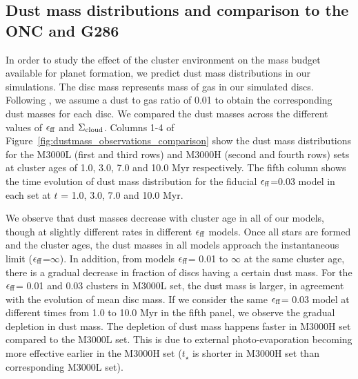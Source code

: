 \documentclass[fleqn,usenatbib]{mnras}
\newcommand\sfeff{\ensuremath{\epsilon_{\rm ff}}\xspace}   %
\newcommand\Sigmacloud{\ensuremath{\Sigma_{\rm cloud}}\xspace} %
\begin{document}
\subsection{Dust mass distributions and comparison to the ONC and G286}
\label{subsec:dustmassdistros}

In order to study the effect of the cluster environment on the mass budget available for planet formation, we predict dust mass distributions in our simulations. The disc mass represents mass of gas in our simulated discs. Following \cite{Bohlin1978ApJ...224..132B}, we assume a dust to gas ratio of 0.01 to obtain the corresponding dust masses for each disc. We compared the dust masses across the different values of \sfeff and \Sigmacloud. Columns 1-4 of Figure~\ref{fig:dustmass_observations_comparison} show the dust mass distributions for the M3000L (first and third rows) and M3000H (second and fourth rows) sets at cluster ages of 1.0, 3.0, 7.0 and 10.0 Myr respectively. The fifth column shows the time evolution of dust mass distribution for the fiducial $\sfeff$=0.03 model in each set at $t$ = 1.0, 3.0, 7.0 and 10.0 Myr.

We observe that dust masses decrease with cluster age in all of our models, though at slightly different rates in different $\epsilon_{\rm ff}$ models. Once all stars are formed and the cluster ages, the dust masses in all models approach the instantaneous limit (\sfeff =$\infty$). In addition, from models \sfeff = 0.01 to $\infty$ at the same cluster age, there is a gradual decrease in fraction of discs having a certain dust mass. For the \sfeff = 0.01 and 0.03 clusters in M3000L set, the dust mass is larger, in agreement with the evolution of mean disc mass. If we consider the same \sfeff = 0.03 model at different times from 1.0 to 10.0 Myr in the fifth panel, we observe the gradual depletion in dust mass. The depletion of dust mass happens faster in M3000H set compared to the M3000L set. This is due to external photo-evaporation becoming more effective earlier in the M3000H set ($t_\star$ is shorter in M3000H set than corresponding M3000L set). 
\end{document}
